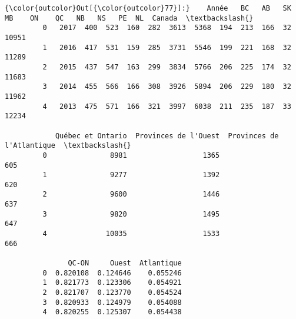 \documentclass[11pt]{article}
\begin{document}
\begin{Verbatim}[commandchars=\\\{\}]
{\color{outcolor}Out[{\color{outcolor}77}]:}    Année   BC   AB   SK   MB    ON    QC   NB   NS   PE  NL  Canada  \textbackslash{}
         0   2017  400  523  160  282  3613  5368  194  213  166  32   10951   
         1   2016  417  531  159  285  3731  5546  199  221  168  32   11289   
         2   2015  437  547  163  299  3834  5766  206  225  174  32   11683   
         3   2014  455  566  166  308  3926  5894  206  229  180  32   11962   
         4   2013  475  571  166  321  3997  6038  211  235  187  33   12234   
         
            Québec et Ontario  Provinces de l'Ouest  Provinces de l'Atlantique  \textbackslash{}
         0               8981                  1365                        605   
         1               9277                  1392                        620   
         2               9600                  1446                        637   
         3               9820                  1495                        647   
         4              10035                  1533                        666   
         
               QC-ON     Ouest  Atlantique  
         0  0.820108  0.124646    0.055246  
         1  0.821773  0.123306    0.054921  
         2  0.821707  0.123770    0.054524  
         3  0.820933  0.124979    0.054088  
         4  0.820255  0.125307    0.054438  
\end{Verbatim}
            
\end{document}
